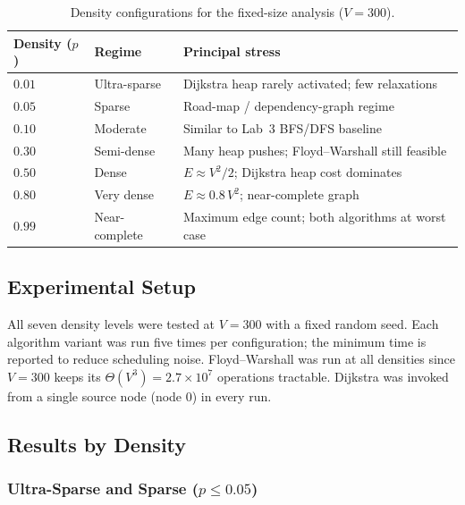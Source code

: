\documentclass[12pt,a4paper]{article}
\begin{document}
	\begin{table}[h!]
		\centering
		\caption{Density configurations for the fixed-size analysis ($V = 300$).}
		\label{tab:density}
		\renewcommand{\arraystretch}{1.3}
		\begin{tabular}{llp{6.5cm}}
			\toprule
			\textbf{Density ($p$)} & \textbf{Regime}   & \textbf{Principal stress} \\
			\midrule
			$0.01$                 & Ultra-sparse      & Dijkstra heap rarely activated; few relaxations \\
			$0.05$                 & Sparse            & Road-map / dependency-graph regime \\
			$0.10$                 & Moderate          & Similar to Lab~3 BFS/DFS baseline \\
			$0.30$                 & Semi-dense        & Many heap pushes; Floyd--Warshall still feasible \\
			$0.50$                 & Dense             & $E \approx V^2/2$; Dijkstra heap cost dominates \\
			$0.80$                 & Very dense        & $E \approx 0.8\,V^2$; near-complete graph \\
			$0.99$                 & Near-complete     & Maximum edge count; both algorithms at worst case \\
			\bottomrule
		\end{tabular}
	\end{table}
	
	\subsection{Experimental Setup}
	
	All seven density levels were tested at $V = 300$ with a fixed random seed.
	Each algorithm variant was run five times per configuration; the minimum time
	is reported to reduce scheduling noise. Floyd--Warshall was run at all densities
	since $V = 300$ keeps its $\Theta(V^3) = 2.7 \times 10^7$ operations tractable.
	Dijkstra was invoked from a single source node (node 0) in every run.
	
	\subsection{Results by Density}
	
	\subsubsection{Ultra-Sparse and Sparse ($p \leq 0.05$)}
	
\end{document}
